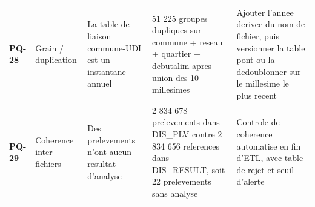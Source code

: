 {\begin{longtable}{@{}p{1.1cm}p{2.2cm}p{4.2cm}p{3.6cm}p{4.3cm}@{}}
\textbf{PQ-28} & Grain / duplication & La table de liaison commune-UDI est un instantane annuel & 51 225 groupes dupliques sur commune + reseau + quartier + debutalim apres union des 10 millesimes & Ajouter l'annee derivee du nom de fichier, puis versionner la table pont ou la dedoublonner sur le millesime le plus recent \\[2pt]
\textbf{PQ-29} & Coherence inter-fichiers & Des prelevements n'ont aucun resultat d'analyse & 2 834 678 prelevements dans DIS\_PLV contre 2 834 656 references dans DIS\_RESULT, soit 22 prelevements sans analyse & Controle de coherence automatise en fin d'ETL, avec table de rejet et seuil d'alerte \\[2pt]
\end{longtable}}

